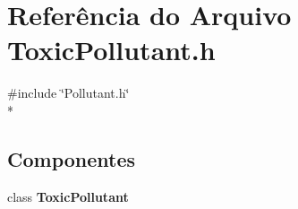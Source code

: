 \section{Referência do Arquivo Toxic\+Pollutant.\+h}
\label{_toxic_pollutant_8h}
{\ttfamily \#include \char`\"{}Pollutant.\+h\char`\"{}}\\*
\subsection*{Componentes}
\begin{DoxyCompactItemize}
\item 
class {\bf Toxic\+Pollutant}
\end{DoxyCompactItemize}
